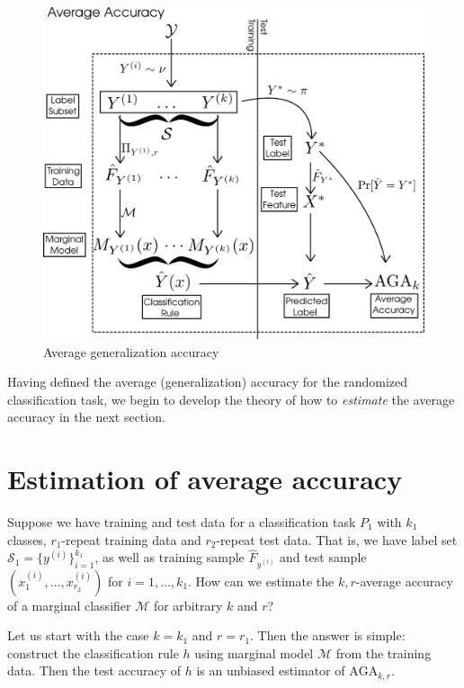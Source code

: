 \documentclass[12pt]{article}
\begin{document}
\begin{figure}[h]
\centering
\includegraphics[scale = 0.3]{average_risk.png}
\caption{Average generalization accuracy}\label{fig:average_risk}
\end{figure}

Having defined the average (generalization) accuracy for the randomized classification
task, we begin to develop the theory of how to \emph{estimate} the
average accuracy in the next section.

\section{Estimation of average accuracy}\label{sec:estimation_average_accuracy}

Suppose we have training and test data for a classification task $P_1$
with $k_1$ classes, $r_1$-repeat training data and $r_2$-repeat test
data.  That is, we have label set $\mathcal{S}_1 =
\{y^{(i)}\}_{i=1}^{k_1}$, as well as training sample $\hat{F}_{y^{(i)}}$
and test sample $(x_1^{(i)},\hdots, x_{r_2}^{(i)})$ for $i =
1,\hdots, k_1$.  How can we estimate the $k, r$-average accuracy of a
marginal classifier $\mathcal{M}$ for arbitrary $k$ and $r$?

Let us start with the case $k = k_1$ and $r = r_1$.  Then the answer
is simple: construct the classification rule $h$ using marginal model
$\mathcal{M}$ from the training data.  Then the test accuracy of $h$ is an
unbiased estimator of $\text{AGA}_{k,r}$.
\end{document}
